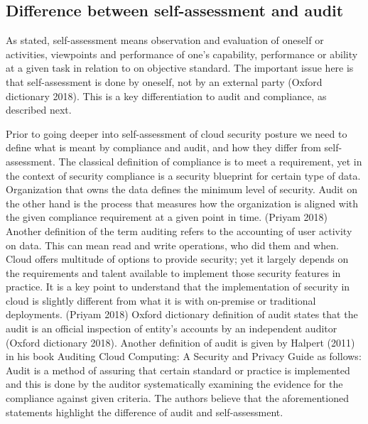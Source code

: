 \documentclass{article}
\begin{document}
\subsection{Difference between self-assessment and audit}
As stated, self-assessment means observation and evaluation of oneself or activities, viewpoints and performance of one's capability, performance or ability at a given task in relation to on objective standard. The important issue here is that self-assessment is done by oneself, not by an external party (Oxford dictionary 2018). This is a key differentiation to audit and compliance, as described next.
\par
Prior to going deeper into self-assessment of cloud security posture we need to define what is meant by compliance and audit, and how they differ from self-assessment.
The classical definition of compliance is to meet a requirement, yet in the context of security compliance is a security blueprint for certain type of data. Organization that owns the data defines the minimum level of security.
Audit on the other hand is the process that measures how the organization is aligned with the given compliance requirement at a given point in time. (Priyam 2018)
Another definition of the term auditing refers to the accounting of user activity on data. This can mean read and write operations, who did them and when.
Cloud offers multitude of options to provide security; yet it largely depends on the requirements and talent available to implement those security features in practice. It is a key point to understand that the implementation of security in cloud is slightly different from what it is with on-premise or traditional deployments. (Priyam 2018)
Oxford dictionary definition of audit states that the audit is an official inspection of entity's accounts by an independent auditor (Oxford dictionary 2018). Another definition of audit is given by Halpert (2011) in his book Auditing Cloud Computing: A Security and Privacy Guide as follows: Audit is a method of assuring that certain standard or practice is implemented and this is done by the auditor systematically examining the evidence for the compliance against given criteria. The authors believe that the aforementioned statements highlight the difference of audit and self-assessment. 
\end{document}
